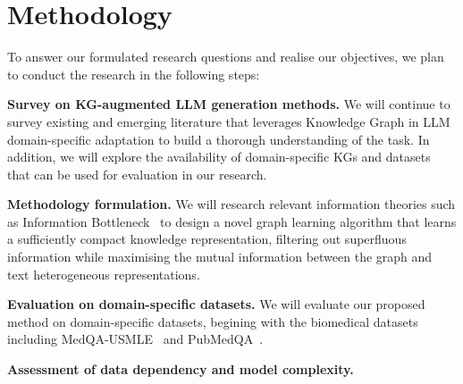 \section*{Methodology}

To answer our formulated research questions and realise our objectives, we plan to conduct the research in the following steps:

\textbf{Survey on KG-augmented LLM generation methods. } 
We will continue to survey existing and emerging literature that leverages Knowledge Graph in LLM domain-specific adaptation to build a thorough understanding of the task. 
In addition, we will explore the availability of domain-specific KGs and datasets that can be used for evaluation in our research.

\textbf{Methodology formulation. }
We will research relevant information theories such as Information Bottleneck~\parencite{IB, vib, gib} to design a novel graph learning algorithm that learns a sufficiently compact knowledge representation, filtering out superfluous information while maximising the mutual information between the graph and text heterogeneous representations.

\textbf{Evaluation on domain-specific datasets. } 
We will evaluate our proposed method on domain-specific datasets, begining with the biomedical datasets including MedQA-USMLE~\parencite{medqa} and PubMedQA~\parencite{pubmedqa}.

\textbf{Assessment of data dependency and model complexity. }

